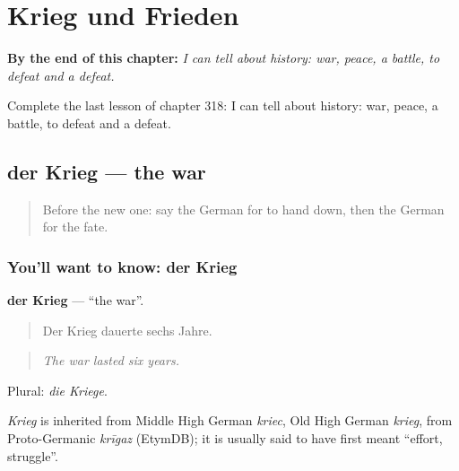 
\chapter{Krieg und Frieden}
\label{ch:ge-krieg-und-frieden}

\begin{chapteropening}
\textbf{By the end of this chapter:} \emph{I can tell about history: war, peace, a battle, to defeat and a defeat.}

Complete the last lesson of chapter 318: I can tell about history: war, peace, a battle, to defeat and a defeat.
\end{chapteropening}

\section[der Krieg]{der Krieg — the war}

\label{lesson:GE-C318-krieg}



\begin{quote}
Before the new one: say the German for to hand down, then the German for the fate.
\end{quote}

\subsection*{You'll want to know: der Krieg}
\textbf{der Krieg} — \textquotedblleft{}the war\textquotedblright{}.

\begin{quote}
Der Krieg dauerte sechs Jahre.
\end{quote}

\begin{quote}
\emph{The war lasted six years.}
\end{quote}

Plural: \emph{die Kriege}.

\begin{cousinweb}
\emph{Krieg} is inherited from Middle High German \emph{kriec}, Old High German \emph{krieg}, from Proto-Germanic \emph{krīgaz} (EtymDB); it is usually said to have first meant \textquotedblleft{}effort, struggle\textquotedblright{}.
\end{cousinweb}

